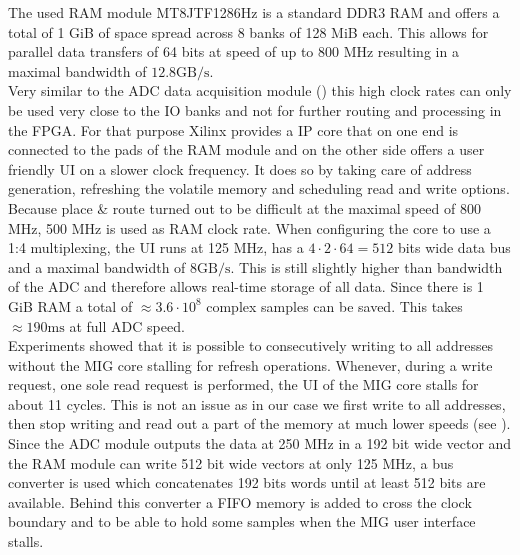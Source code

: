 The used \gls{RAM} module MT8JTF1286Hz is a standard \acrshort{DDR}3 \gls{RAM}
and offers a total of 1 GiB of space spread across 8 banks of 128 MiB each.
This allows for parallel data transfers of 64 bits at speed of up to 800 MHz
resulting in a maximal bandwidth of $12.8 \text{GB}/\text{s}$. \\

Very similar to the \gls{ADC} data acquisition module ()
this high clock rates can only be used very close to the \gls{IO} banks
and not for further routing and processing in the \gls{FPGA}.
For that purpose Xilinx provides a \gls{IP} core that on one end is connected
to the pads of the \gls{RAM} module and on the other side offers a user
friendly \gls{UI} on a slower clock frequency.
It does so by taking care of address generation, refreshing the volatile
memory and scheduling read and write options. \\

Because place \& route turned out to be difficult at the maximal speed
of 800 MHz, 500 MHz is used as \gls{RAM} clock rate.
When configuring the core to use a 1:4 multiplexing, the \gls{UI} runs
at 125 MHz, has a $4 \cdot 2 \cdot 64 = 512$ bits wide data bus
and a maximal bandwidth of $8 \text{GB}/\text{s}$. This is still slightly
higher than bandwidth of the \gls{ADC} and therefore allows real-time
storage of all data. Since there is 1 GiB \gls{RAM}
a total of $\approx 3.6 \cdot 10^8$ complex samples can be saved. This
takes $\approx 190 \text{ms}$ at full \gls{ADC} speed. \\

Experiments showed that it is possible to consecutively writing to all
addresses without the \gls{MIG} core stalling for refresh operations.
Whenever, during a write request, one sole read request
is performed, the \gls{UI} of the \gls{MIG} core stalls for about 11
cycles. This is not an issue as in our case we first write
to all addresses, then stop writing and read out a part of the memory
at much lower speeds (see ). \\

Since the \gls{ADC} module outputs the data at 250 MHz in a 192 bit
wide vector and the \gls{RAM} module can write 512 bit wide vectors
at only 125 MHz, a bus converter is used which concatenates 192 bits
words until at least 512 bits are available. Behind this converter
a \gls{FIFO} memory is added to cross the clock boundary and to be able
to hold some samples when the \gls{MIG} user interface stalls. \\

